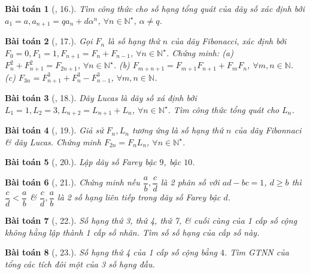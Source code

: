 \documentclass{article}
\newtheorem{baitoan}{Bài toán}
\begin{document}
\begin{baitoan}[\cite{TLCT_dai_so_giai_tich_11}, 16.]
	Tìm công thức cho số hạng tổng quát của dãy số xác định bởi $a_1 = a,a_{n+1} = qa_n + d\alpha^n$, $\forall n\in\mathbb{N}^\star$, $\alpha\ne q$.
\end{baitoan}

\begin{baitoan}[\cite{TLCT_dai_so_giai_tich_11}, 17.]
	Gọi $F_n$ là số hạng thứ $n$ của dãy Fibonacci, xác định bởi $F_0 = 0,F_1 = 1,F_{n+1} = F_n + F_{n-1}$, $\forall n\in\mathbb{N}^\star$. Chứng minh: (a) $F_n^2 + F_{n+1}^2 = F_{2n+1}$, $\forall n\in\mathbb{N}^\star$. (b) $F_{m+n+1} = F_{m+1}F_{n+1} + F_mF_n$, $\forall m,n\in\mathbb{N}$. (c) $F_{3n} = F_{n+1}^3 + F_n^3 - F_{n-1}^3$, $\forall m,n\in\mathbb{N}$.
\end{baitoan}

\begin{baitoan}[\cite{TLCT_dai_so_giai_tich_11}, 18.]
	Dãy Lucas là dãy số xá định bởi $L_1 = 1,L_2 = 3,L_{n+2} = L_{n+1} + L_n$, $\forall n\in\mathbb{N}^\star$. Tìm công thức tổng quát cho $L_n$.
\end{baitoan}

\begin{baitoan}[\cite{TLCT_dai_so_giai_tich_11}, 19.]
	Giả sử $F_n,L_n$ tương ứng là số hạng thứ $n$ của dãy Fibonnaci \& dãy Lucas. Chứng minh $F_{2n} = F_nL_n$, $\forall n\in\mathbb{N}^\star$.
\end{baitoan}

\begin{baitoan}[\cite{TLCT_dai_so_giai_tich_11}, 20.]
	Lập dãy số Farey bậc $9$, bậc $10$.
\end{baitoan}

\begin{baitoan}[\cite{TLCT_dai_so_giai_tich_11}, 21.]
	Chứng minh nếu $\dfrac{a}{b},\dfrac{c}{d}$ là 2 phân số với $ad - bc = 1$, $d\ge b$ thì $\dfrac{c}{d} < \dfrac{a}{b}$ \& $\dfrac{c}{d},\dfrac{a}{b}$ là 2 số hạng liên tiếp trong dãy số Farey bậc $d$.
\end{baitoan}

\begin{baitoan}[\cite{TLCT_dai_so_giai_tich_11}, 22.]
	Số hạng thứ 3, thứ 4, thứ 7, \& cuối cùng của 1 cấp số cộng không hằng lập thành 1 cấp số nhân. Tìm số số hạng của cấp số này.
\end{baitoan}

\begin{baitoan}[\cite{TLCT_dai_so_giai_tich_11}, 23.]
	Số hạng thứ 4 của 1 cấp số cộng bằng $4$. Tìm {\rm GTNN} của tổng các tích đôi một của 3 số hạng đầu.
\end{baitoan}
\end{document}
